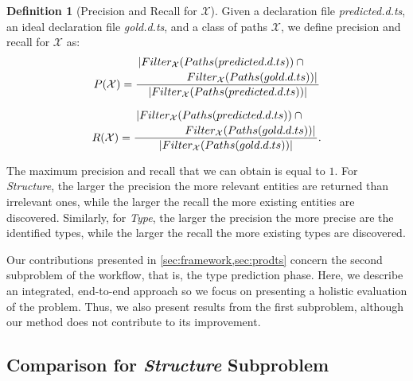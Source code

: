 \documentclass[sigplan,10pt,review,anonymous]{acmart} %
\theoremstyle{plain}
\theoremstyle{remark}
\theoremstyle{definition}
\newtheorem{defn}{Definition}[section]
\begin{document}
\begin{defn}[Precision and Recall for $\mathcal{X}$] \label{def:precision_recall}
	Given a declaration file \textit{predicted.d.ts},
	an ideal declaration file \textit{gold.d.ts}, and a class of paths $\mathcal{X}$,
	we define precision and recall for $\mathcal{X}$ as:
	\begin{equation}
		P(\mathcal{X}) =
		\dfrac{\splitdfrac{|Filter_\mathcal{X}(Paths(predicted.d.ts)) \cap {}}{Filter_\mathcal{X}(Paths(gold.d.ts)) |}}{|Filter_\mathcal{X}(Paths(predicted.d.ts)) |}
	\end{equation}

	\begin{equation}
		R(\mathcal{X}) =
		\dfrac{\splitdfrac{|Filter_\mathcal{X}(Paths(predicted.d.ts)) \cap {}} {Filter_\mathcal{X}(Paths(gold.d.ts)) |}}
		{|Filter_\mathcal{X}(Paths(gold.d.ts))|}.
	\end{equation}
\end{defn}
%
The maximum precision and recall that we can obtain is equal to $1$.
%
For \textit{Structure}, the larger the precision the more relevant entities are returned than irrelevant ones,
while the larger the recall the more existing entities are discovered.
%
Similarly, for \textit{Type}, the larger the precision the more precise are the identified types,
while the larger the recall the more existing types are discovered.

Our contributions presented in \cref{sec:framework,sec:prodts} concern the second subproblem of the workflow,
that is, the type prediction phase.
%
Here, we describe an integrated, end-to-end approach so we focus on presenting a holistic evaluation of the problem.
%
Thus, we also present results from the first subproblem,
although our method does not contribute to its improvement.
%

\subsection{Comparison for \textit{Structure} Subproblem}\label{ssec:structure_comparison}
\end{document}
